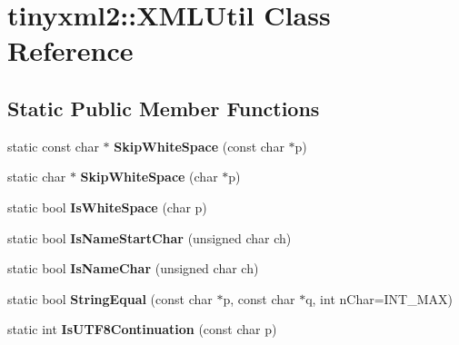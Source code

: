 \hypertarget{classtinyxml2_1_1_x_m_l_util}{\section{tinyxml2\-:\-:X\-M\-L\-Util Class Reference}
\label{classtinyxml2_1_1_x_m_l_util}
}
\subsection*{Static Public Member Functions}
\begin{DoxyCompactItemize}
\item 
\hypertarget{classtinyxml2_1_1_x_m_l_util_a9333d20f2a34325b5115ca45849c4b2a}{static const char $\ast$ {\bfseries Skip\-White\-Space} (const char $\ast$p)}\label{classtinyxml2_1_1_x_m_l_util_a9333d20f2a34325b5115ca45849c4b2a}

\item 
\hypertarget{classtinyxml2_1_1_x_m_l_util_aa48025be8843ec5a79b65579d31bd8fc}{static char $\ast$ {\bfseries Skip\-White\-Space} (char $\ast$p)}\label{classtinyxml2_1_1_x_m_l_util_aa48025be8843ec5a79b65579d31bd8fc}

\item 
\hypertarget{classtinyxml2_1_1_x_m_l_util_a357ec3af8fc433d19023a815f45e8e33}{static bool {\bfseries Is\-White\-Space} (char p)}\label{classtinyxml2_1_1_x_m_l_util_a357ec3af8fc433d19023a815f45e8e33}

\item 
\hypertarget{classtinyxml2_1_1_x_m_l_util_abe106a69ac4d942a4381a4d9dfd0e0bd}{static bool {\bfseries Is\-Name\-Start\-Char} (unsigned char ch)}\label{classtinyxml2_1_1_x_m_l_util_abe106a69ac4d942a4381a4d9dfd0e0bd}

\item 
\hypertarget{classtinyxml2_1_1_x_m_l_util_a04b17341538fa11752f24b4301d19485}{static bool {\bfseries Is\-Name\-Char} (unsigned char ch)}\label{classtinyxml2_1_1_x_m_l_util_a04b17341538fa11752f24b4301d19485}

\item 
\hypertarget{classtinyxml2_1_1_x_m_l_util_acfcd287cacfd2533e1bc9ea4dfb56602}{static bool {\bfseries String\-Equal} (const char $\ast$p, const char $\ast$q, int n\-Char=I\-N\-T\-\_\-\-M\-A\-X)}\label{classtinyxml2_1_1_x_m_l_util_acfcd287cacfd2533e1bc9ea4dfb56602}

\item 
\hypertarget{classtinyxml2_1_1_x_m_l_util_a24ba87b1d22528167a3d16c4f52096bf}{static int {\bfseries Is\-U\-T\-F8\-Continuation} (const char p)}\label{classtinyxml2_1_1_x_m_l_util_a24ba87b1d22528167a3d16c4f52096bf}


\end{DoxyCompactItemize}
